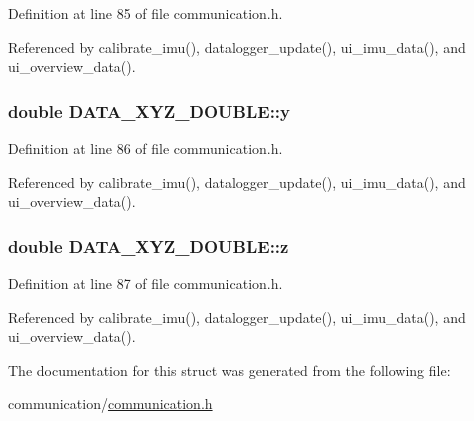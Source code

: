 Definition at line 85 of file communication.\-h.



Referenced by calibrate\-\_\-imu(), datalogger\-\_\-update(), ui\-\_\-imu\-\_\-data(), and ui\-\_\-overview\-\_\-data().

\hypertarget{structDATA__XYZ__DOUBLE_a198a27b5df3b5b0bf461b0e481e22a82}{
\subsubsection[{y}]{\setlength{\rightskip}{0pt plus 5cm}double D\-A\-T\-A\-\_\-\-X\-Y\-Z\-\_\-\-D\-O\-U\-B\-L\-E\-::y}}\label{structDATA__XYZ__DOUBLE_a198a27b5df3b5b0bf461b0e481e22a82}


Definition at line 86 of file communication.\-h.



Referenced by calibrate\-\_\-imu(), datalogger\-\_\-update(), ui\-\_\-imu\-\_\-data(), and ui\-\_\-overview\-\_\-data().

\hypertarget{structDATA__XYZ__DOUBLE_a9556e8868c223ff3e28756ea18a284c0}{
\subsubsection[{z}]{\setlength{\rightskip}{0pt plus 5cm}double D\-A\-T\-A\-\_\-\-X\-Y\-Z\-\_\-\-D\-O\-U\-B\-L\-E\-::z}}\label{structDATA__XYZ__DOUBLE_a9556e8868c223ff3e28756ea18a284c0}


Definition at line 87 of file communication.\-h.



Referenced by calibrate\-\_\-imu(), datalogger\-\_\-update(), ui\-\_\-imu\-\_\-data(), and ui\-\_\-overview\-\_\-data().



The documentation for this struct was generated from the following file\-:\begin{DoxyCompactItemize}
\item 
communication/\hyperlink{communication_8h}{communication.\-h}\end{DoxyCompactItemize}
